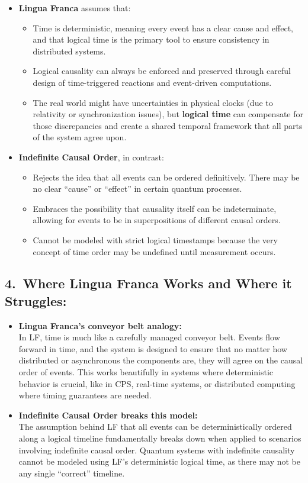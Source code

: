 \begin{itemize}[leftmargin=1.5em]
\item \textbf{Lingua Franca} assumes that:
  \begin{itemize}[leftmargin=1.25em]
  \item Time is deterministic, meaning every event has a clear cause and effect, and that logical time is the primary tool to ensure consistency in distributed systems.
  \item Logical causality can always be enforced and preserved through careful design of time-triggered reactions and event-driven computations.
  \item The real world might have uncertainties in physical clocks (due to relativity or synchronization issues), but \textbf{logical time} can compensate for those discrepancies and create a shared temporal framework that all parts of the system agree upon.
  \end{itemize}
\item \textbf{Indefinite Causal Order}, in contrast:
  \begin{itemize}[leftmargin=1.25em]
  \item Rejects the idea that all events can be ordered definitively. There may be no clear ``cause'' or ``effect'' in certain quantum processes.
  \item Embraces the possibility that causality itself can be indeterminate, allowing for events to be in superpositions of different causal orders.
  \item Cannot be modeled with strict logical timestamps because the very concept of time order may be undefined until measurement occurs.
  \end{itemize}
\end{itemize}

\subsection*{4.\ Where Lingua Franca Works and Where it Struggles:}

\begin{itemize}[leftmargin=1.5em]
\item \textbf{Lingua Franca's conveyor belt analogy:}\\
  In LF, time is much like a carefully managed conveyor belt. Events flow forward in time, and the system is designed to ensure that no matter how distributed or asynchronous the components are, they will agree on the causal order of events. This works beautifully in systems where deterministic behavior is crucial, like in CPS, real-time systems, or distributed computing where timing guarantees are needed.

\item \textbf{Indefinite Causal Order breaks this model:}\\
  The assumption behind LF that all events can be deterministically ordered along a logical timeline fundamentally breaks down when applied to scenarios involving indefinite causal order. Quantum systems with indefinite causality cannot be modeled using LF's deterministic logical time, as there may not be any single ``correct'' timeline.
\end{itemize}

